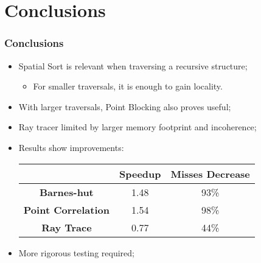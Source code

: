 \section{Conclusions}
\begin{frame}
	\frametitle{Conclusions}
	\begin{itemize}\itemsep=15pt
		\item Spatial Sort is relevant when traversing a recursive structure;
		\begin{itemize}
			\item For smaller traversals, it is enough to gain locality.
		\end{itemize}

		\item With larger traversals, Point Blocking also proves useful;

		\item Ray tracer limited by larger memory footprint and incoherence;

		\item Results show improvements:
		\begin{table}
			\begin{tabular}{|c|cc|}
				\hline
				& \textbf{Speedup} & \textbf{Misses Decrease}	\\
				\hline
				\textbf{Barnes-hut} &  1.48 & 93\%	\\
				\textbf{Point Correlation} & 1.54 & 98\%	\\
				\textbf{Ray Trace} & 0.77 & 44\%	\\
				\hline
			\end{tabular}
		\end{table}

		\item More rigorous testing required;
	\end{itemize}
\end{frame}